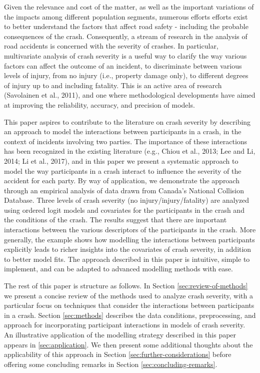 \documentclass[]{elsarticle} %
\begin{document}
Given the relevance and cost of the matter, as well as the important
variations of the impacts among different population segments, numerous
efforts efforts exist to better understand the factors that affect road
safety - including the probable consequences of the crash. Consequently,
a stream of research in the analysis of road accidents is concerned with
the severity of crashes. In particular, multivariate analysis of crash
severity is a useful way to clarify the way various factors can affect
the outcome of an incident, to discriminate between various levels of
injury, from no injury (i.e., property damage only), to different
degrees of injury up to and including fatality. This is an active area
of research (Savolainen et al., 2011), and one where methodological
developments have aimed at improving the reliability, accuracy, and
precision of models.

This paper aspires to contribute to the literature on crash severity by
describing an approach to model the interactions between participants in
a crash, in the context of incidents involving two parties. The
importance of these interactions has been recognized in the existing
literature (e.g., Chiou et al., 2013; Lee and Li, 2014; Li et al.,
2017), and in this paper we present a systematic approach to model the
way participants in a crash interact to influence the severity of the
accident for each party. By way of application, we demonstrate the
approach through an empirical analysis of data drawn from Canada's
National Collision Database. Three levels of crash severity (no
injury/injury/fatality) are analyzed using ordered logit models and
covariates for the participants in the crash and the conditions of the
crash. The results suggest that there are important interactions between
the various descriptors of the participants in the crash. More
generally, the example shows how modelling the interactions between
participants explicitly leads to richer insights into the covariates of
crash severity, in addition to better model fits. The approach described
in this paper is intuitive, simple to implement, and can be adapted to
advanced modelling methods with ease.

The rest of this paper is structure as follows. In Section
\ref{sec:review-of-methods} we present a concise review of the methods
used to analyze crash severity, with a particular focus on techniques
that consider the interactions between participants in a crash. Section
\ref{sec:methods} describes the data conditions, preprocessing, and
approach for incorporating participant interactions in models of crash
severity. An illustrative application of the modelling strategy
described in this paper appears in \ref{sec:application}. We then
present some additional thoughts about the applicability of this
approach in Section \ref{sec:further-considerations} before offering
some concluding remarks in Section \ref{sec:concluding-remarks}.
\end{document}
